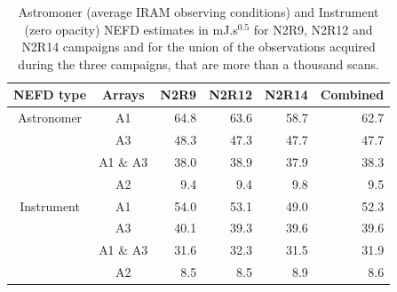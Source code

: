 \begin{table}
\begin{center}
\begin{tabular}{|c|c|rrrr|}
\hline
NEFD type & Arrays & N2R9 & N2R12 & N2R14 & Combined  \\
\hline\hline
Astronomer  & A1       &  64.8 & 63.6 &  58.7 &  62.7 \\
            & A3       &  48.3 & 47.3 &  47.7 &  47.7 \\ 
            & A1 \& A3 &  38.0 & 38.9 &  37.9 &  38.3 \\
            & A2       &   9.4 &  9.4 &   9.8 &   9.5  \\
\hline
Instrument  & A1       &   54.0 & 53.1 &  49.0 & 52.3  \\
            & A3       &   40.1 & 39.3 &  39.6 & 39.6  \\ 
            & A1 \& A3 &   31.6 & 32.3 &  31.5 & 31.9  \\
            & A2       &    8.5 &  8.5 &  8.9  &  8.6  \\
\hline\hline
\end{tabular}
\label{tab:baseline_nefd_pipeline}
\caption[NEFD using method 3]{Astromoner (average IRAM observing conditions) and Instrument (zero opacity) NEFD estimates in mJ.s$^{0.5}$ for N2R9, N2R12 and N2R14 campaigns and for the union of the observations acquired during the three campaigns, that are more than a thousand scans. }
\end{center}
\end{table}





